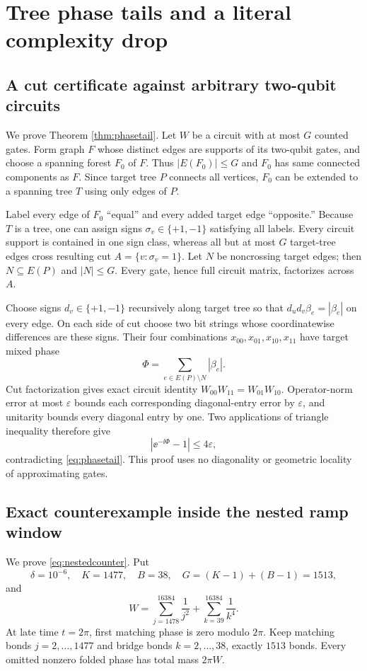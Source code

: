 \section{Tree phase tails and a literal complexity drop}

\subsection{A cut certificate against arbitrary two-qubit circuits}

We prove Theorem \ref{thm:phasetail}.  Let $W$ be a circuit with at most
$G$ counted gates.  Form graph $F$ whose distinct edges are supports of its
two-qubit gates, and choose a spanning forest $F_0$ of $F$.  Thus
$|E(F_0)|\le G$ and $F_0$ has same connected components as $F$.  Since target
tree $P$ connects all vertices, $F_0$ can be extended to a spanning tree $T$
using only edges of $P$.

Label every edge of $F_0$ ``equal'' and every added target edge ``opposite.''
Because $T$ is a tree, one can assign signs $\sigma_v\in\{+1,-1\}$ satisfying
all labels.  Every circuit support is contained in one sign class, whereas
all but at most $G$ target-tree edges cross resulting cut $A=\{v:\sigma_v=1\}$.
Let $N$ be noncrossing target edges; then $N\subseteq E(P)$ and $|N|\le G$.
Every gate, hence full circuit matrix, factorizes across $A$.

Choose signs $d_v\in\{+1,-1\}$ recursively along target tree so that
$d_ud_v\beta_e=|\beta_e|$ on every edge.  On each side of cut choose two bit
strings whose coordinatewise differences are these signs.  Their four
combinations $x_{00},x_{01},x_{10},x_{11}$ have target mixed phase
\[
 \Phi=\sum_{e\in E(P)\setminus N}|\beta_e|.
\]
Cut factorization gives exact circuit identity
$W_{00}W_{11}=W_{01}W_{10}$.  Operator-norm error at most $\varepsilon$
bounds each corresponding diagonal-entry error by $\varepsilon$, and
unitarity bounds every diagonal entry by one.  Two applications of triangle
inequality therefore give
\[
 \left|\ee^{-\ii\Phi}-1\right|\le4\varepsilon,
\]
contradicting \eqref{eq:phasetail}.  This proof uses no diagonality or
geometric locality of approximating gates.

\subsection{Exact counterexample inside the nested ramp window}

We prove \eqref{eq:nestedcounter}.  Put
\[
 \delta=10^{-6},\quad K=1477,\quad B=38,\quad
 G=(K-1)+(B-1)=1513,
\]
and
\begin{equation}
 W=\sum_{j=1478}^{16384}\frac1{j^2}
   +\sum_{k=39}^{16384}\frac1{k^4}.                 \label{eq:counterW}
\end{equation}
At late time $t=2\pi$, first matching phase is zero modulo $2\pi$.  Keep
matching bonds $j=2,\ldots,1477$ and bridge bonds $k=2,\ldots,38$, exactly
$1513$ bonds.  Every omitted nonzero folded phase has total mass $2\pi W$.

